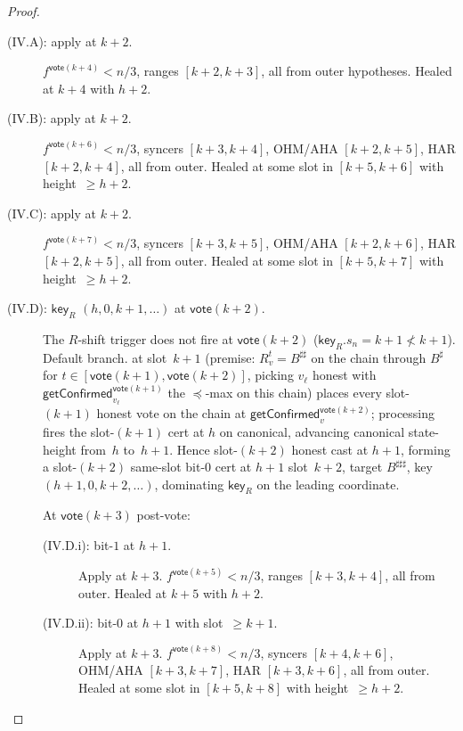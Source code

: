 \ifx\litemode\undefined\documentclass{article}\fi
\newcommand{\key}{\mathsf{key}}
\newcommand{\vote}{\mathsf{vote}}
\newcommand{\getConfirmed}{\textsf{getConfirmed}\xspace}
\theoremstyle{plain}
\theoremstyle{definition}
\theoremstyle{remark}
\begin{document}
\begin{proof}
\begin{description}
\begin{description}
\item[{(IV.A): apply  at $k+2$.}]\hfill
$f^{\vote(k+4)} < n/3$, ranges $[k+2, k+3]$, all from outer hypotheses. Healed at $k+4$ with $h+2$.

\item[{(IV.B): apply  at $k+2$.}]\hfill
$f^{\vote(k+6)} < n/3$, syncers $[k+3, k+4]$, OHM/AHA $[k+2, k+5]$, HAR $[k+2, k+4]$, all from outer. Healed at some slot in $[k+5, k+6]$ with height~$\geq h+2$.

\item[{(IV.C): apply  at $k+2$.}]\hfill
$f^{\vote(k+7)} < n/3$, syncers $[k+3, k+5]$, OHM/AHA $[k+2, k+6]$, HAR $[k+2, k+5]$, all from outer. Healed at some slot in $[k+5, k+7]$ with height~$\geq h+2$.

\item[{(IV.D): $\key_R$ $(h, 0, k+1, \ldots)$ at $\vote(k+2)$.}]\hfill
The $R$-shift trigger does not fire at $\vote(k+2)$ ($\key_R.s_n = k+1 \not< k+1$). Default branch.  at slot~$k+1$ (premise: $R_v^t = B^{\sharp\sharp}$ on the chain through $B^\sharp$ for $t \in [\vote(k+1), \vote(k+2)]$, picking $v_\ell$ honest with $\getConfirmed_{v_\ell}^{\vote(k+1)}$ the $\preceq$-max on this chain) places every slot-$(k+1)$ honest vote on the chain at $\getConfirmed_v^{\vote(k+2)}$; processing fires the slot-$(k+1)$ cert at $h$ on canonical, advancing canonical state-height from~$h$ to~$h+1$. Hence slot-$(k+2)$ honest cast at $h+1$, forming a slot-$(k+2)$ same-slot bit-$0$ cert at $h+1$ slot~$k+2$, target $B^{\sharp\sharp\sharp}$, key $(h+1, 0, k+2, \ldots)$, dominating $\key_R$ on the leading coordinate.

At $\vote(k+3)$ post-vote:
\begin{description}
  \item[{(IV.D.i): bit-$1$ at $h+1$.}] Apply  at $k+3$. $f^{\vote(k+5)} < n/3$, ranges $[k+3, k+4]$, all from outer. Healed at $k+5$ with $h+2$.
  \item[{(IV.D.ii): bit-$0$ at $h+1$ with slot~$\geq k+1$.}] Apply  at $k+3$. $f^{\vote(k+8)} < n/3$, syncers $[k+4, k+6]$, OHM/AHA $[k+3, k+7]$, HAR $[k+3, k+6]$, all from outer. Healed at some slot in $[k+5, k+8]$ with height~$\geq h+2$.
\end{description}
\end{description}


\end{description}
\end{proof}
\end{document}

